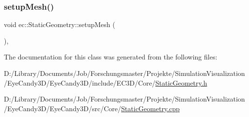 \subsubsection{\texorpdfstring{setup\+Mesh()}{setupMesh()}}
{\footnotesize\ttfamily void ec\+::\+Static\+Geometry\+::setup\+Mesh (\begin{DoxyParamCaption}{ }\end{DoxyParamCaption})\hspace{0.3cm}{\ttfamily [protected]}, {\ttfamily [virtual]}}



The documentation for this class was generated from the following files\+:\begin{DoxyCompactItemize}
\item 
D\+:/\+Library/\+Documents/\+Job/\+Forschungsmaster/\+Projekte/\+Simulation\+Visualization/\+Eye\+Candy3\+D/\+Eye\+Candy3\+D/include/\+E\+C3\+D/\+Core/\mbox{\hyperlink{_static_geometry_8h}{Static\+Geometry.\+h}}\item 
D\+:/\+Library/\+Documents/\+Job/\+Forschungsmaster/\+Projekte/\+Simulation\+Visualization/\+Eye\+Candy3\+D/\+Eye\+Candy3\+D/src/\+Core/\mbox{\hyperlink{_static_geometry_8cpp}{Static\+Geometry.\+cpp}}\end{DoxyCompactItemize}

